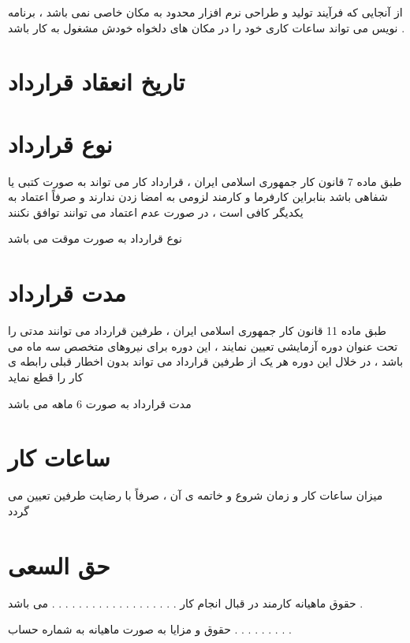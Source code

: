 \documentclass[12pt]{article}
\begin{document}
از آنجایی که فرآیند تولید و طراحی نرم افزار محدود به مکان خاصی نمی باشد ، برنامه نویس می تواند ساعات کاری خود را در مکان های دلخواه خودش مشغول به کار باشد .


\section{تاریخ انعقاد قرارداد}



\section{نوع قرارداد}

\begin{tcolorbox}[
title=تبصره 2
]
طبق ماده 7 قانون کار جمهوری اسلامی ایران ، قرارداد کار می تواند به صورت کتبی یا شفاهی باشد بنابراین کارفرما و  کارمند لزومی به امضا زدن ندارند و صرفاً اعتماد به یکدیگر کافی است ، در صورت عدم اعتماد می توانند توافق نکنند
\end{tcolorbox}

نوع قرارداد به صورت موقت می باشد


\section{مدت قرارداد}

\begin{tcolorbox}[
title=تبصره 3
]
طبق ماده 11 قانون کار جمهوری اسلامی ایران ، طرفین قرارداد می توانند مدتی را تحت عنوان دوره آزمایشی تعیین نمایند ، این دوره برای نیروهای متخصص سه ماه می باشد ، در خلال این دوره هر یک از طرفین قرارداد می تواند بدون اخطار قبلی رابطه ی کار را قطع نماید 
\end{tcolorbox}

مدت قرارداد به صورت 6 ماهه می باشد


\section{ساعات کار}

میزان ساعات کار و زمان شروع و خاتمه ی آن ، صرفاً با رضایت طرفین تعیین می گردد


\section{حق السعی}

حقوق ماهیانه کارمند در قبال انجام کار . . . . . . . . . . . . . . . . . . . می باشد .

حقوق و مزایا به صورت ماهیانه به شماره حساب  . . . . . . . . . 
\end{document}
